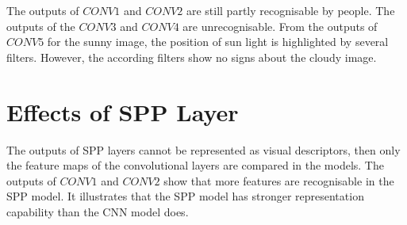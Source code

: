 The outputs of $CONV1$ and $CONV2$ are still partly recognisable by people. The outputs of the $CONV3$ and $CONV4$ are unrecognisable. From the outputs of $CONV5$ for the sunny image, the position of sun light is highlighted by several filters. However, the according filters show no signs about the cloudy image.

\section{Effects of SPP Layer}

The outputs of SPP layers cannot be represented as visual descriptors, then only the feature maps of the convolutional layers are compared in the models. The outputs of $CONV1$ and $CONV2$ show that more features are recognisable in the SPP model. It illustrates that the SPP model has stronger representation capability than the CNN model does.
 
